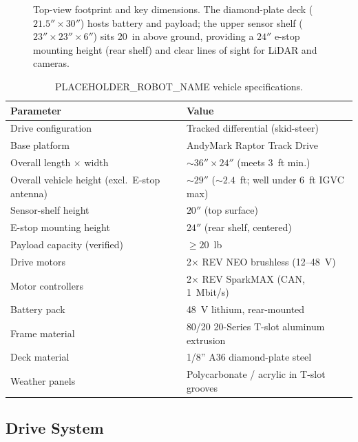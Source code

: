 \documentclass[11pt, letterpaper]{article}
\newcommand{\robotname}{PLACEHOLDER\_ROBOT\_NAME}
\begin{document}
\begin{figure}[H]
    \centering
    
    \caption{Top-view footprint and key dimensions. The diamond-plate deck
    ($21.5'' \times 30''$) hosts battery and payload; the upper sensor shelf
    ($23'' \times 23'' \times 6''$) sits 20~in above ground, providing a $24''$
    e-stop mounting height (rear shelf) and clear lines of sight for LiDAR and cameras.}
    \label{fig:frame_dims}
\end{figure}

\begin{table}[H]
    \centering
    \small
    \caption{\robotname{} vehicle specifications.}
    \label{tab:specs}
    \begin{tabular}{l l}
        \toprule
        \textbf{Parameter} & \textbf{Value} \\
        \midrule
        Drive configuration & Tracked differential (skid-steer) \\
        Base platform & AndyMark Raptor Track Drive \\
        Overall length $\times$ width & $\sim 36'' \times 24''$ (meets 3~ft min.) \\
        Overall vehicle height (excl.\ E-stop antenna) & $\sim 29''$ ($\sim 2.4$~ft; well under 6~ft IGVC max) \\
        Sensor-shelf height & $20''$ (top surface) \\
        E-stop mounting height & $24''$ (rear shelf, centered) \\
        Payload capacity (verified) & $\geq 20$~lb \\
        Drive motors & 2$\times$ REV NEO brushless (12--48~V) \\
        Motor controllers & 2$\times$ REV SparkMAX (CAN, 1~Mbit/s) \\
        Battery pack & 48~V lithium, rear-mounted \\
        Frame material & 80/20 20-Series T-slot aluminum extrusion \\
        Deck material & 1/8'' A36 diamond-plate steel \\
        Weather panels & Polycarbonate / acrylic in T-slot grooves \\
        \bottomrule
    \end{tabular}
\end{table}

\subsection{Drive System}
\end{document}

